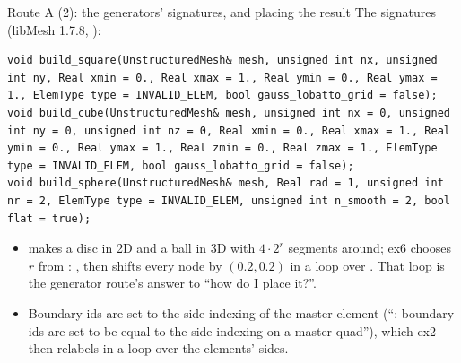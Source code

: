 \documentclass[aspectratio=169,11pt]{beamer}
\begin{document}
\begin{frame}[fragile]{Route A (2): the generators' signatures, and placing the result}
\label{fr:generators2}
\footnotesize
The signatures (libMesh 1.7.8, ):
\begin{lstlisting}[style=cpptiny]
void build_square(UnstructuredMesh& mesh, unsigned int nx, unsigned int ny, Real xmin = 0., Real xmax = 1., Real ymin = 0., Real ymax = 1., ElemType type = INVALID_ELEM, bool gauss_lobatto_grid = false);
void build_cube(UnstructuredMesh& mesh, unsigned int nx = 0, unsigned int ny = 0, unsigned int nz = 0, Real xmin = 0., Real xmax = 1., Real ymin = 0., Real ymax = 1., Real zmin = 0., Real zmax = 1., ElemType type = INVALID_ELEM, bool gauss_lobatto_grid = false);
void build_sphere(UnstructuredMesh& mesh, Real rad = 1, unsigned int nr = 2, ElemType type = INVALID_ELEM, unsigned int n_smooth = 2, bool flat = true);
\end{lstlisting}
\begin{itemize}
  \item {} makes a disc in 2D and a ball in 3D with $4\cdot 2^{r}$ segments around; ex6 chooses $r$ from : , then shifts every node by $(0.2, 0.2)$ in a loop over . That loop is the generator route's answer to ``how do I place it?''.
  \item Boundary ids are set to the side indexing of the master element (``: boundary ids are set to be equal to the side indexing on a master quad''), which ex2 then relabels in a loop over the elements' sides.
\end{itemize}
\end{frame}
\end{document}
